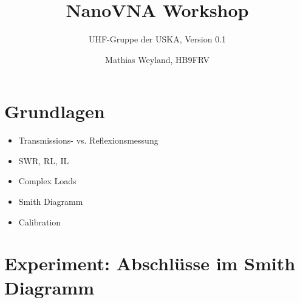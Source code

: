 \documentclass[twoside,a4paper,11pt,halfparskip,DIV=11,notitlepage]{scrartcl}
\title{NanoVNA Workshop}
\author{UHF-Gruppe der USKA, Version 0.1}
\date{Mathias Weyland, HB9FRV} %
\newcounter{uebungscounter}
\newcommand{\uebung}[1]{
    \stepcounter{uebungscounter}
    \section{Übung \arabic{uebungscounter}: #1}
    \renewcommand{\labelenumi}{\arabic{uebungscounter}.\arabic{enumi}}
}
\begin{document}
\maketitle
\thispagestyle{empty}

\tableofcontents

\vfill


\vfill

\newpage



\section{Grundlagen}

\begin{itemize}
    \item Transmissions- vs. Reflexionsmessung
    \item SWR, RL, IL
    \item Complex Loads
    \item Smith Diagramm
    \item Calibration
\end{itemize}

\section{Experiment: Abschlüsse im Smith Diagramm}
\end{document}
